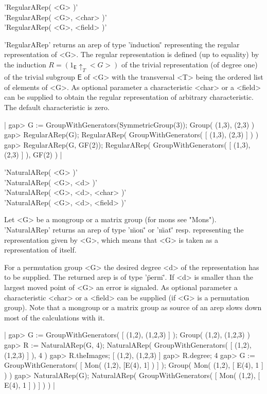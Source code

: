 
'RegularARep( <G> )'\\
'RegularARep( <G>, <char> )'\\
'RegularARep( <G>, <field> )'

'RegularARep' returns an arep of type '\"induction\"' representing
the regular representation of <G>. The regular representation is 
defined (up to equality) by the induction 
$R = (1_{\mathsf{E}}\uparrow_T <G>)$ of the trivial representation
(of degree one) of the trivial subgroup $\mathsf{E}$ of <G> with 
the transversal <T> being the ordered list of elements of <G>.
As optional parameter a characteristic <char> or a <field> 
can be supplied to obtain the regular representation of arbitrary 
characteristic. The default characteristic is zero.

|    gap> G := GroupWithGenerators(SymmetricGroup(3));
    Group( (1,3), (2,3) )
    gap> RegularARep(G);
    RegularARep( GroupWithGenerators( [ (1,3), (2,3) ] ) )
    gap> RegularARep(G, GF(2));
    RegularARep( GroupWithGenerators( [ (1,3), (2,3) ] ), GF(2) ) |


'NaturalARep( <G> )'\\
'NaturalARep( <G>, <d> )'\\
'NaturalARep( <G>, <d>, <char> )'\\
'NaturalARep( <G>, <d>, <field> )'

Let <G> be a mongroup or a matrix group (for mons see "Mons"). 
'NaturalARep' returns an arep of type '\"mon\"' or '\"mat\"' resp. 
representing the representation given by <G>, 
which means that <G> is taken as a representation of itself.

For a permutation group <G> the desired degree <d> of the 
representation has to be supplied. The returned arep is of 
type '\"perm\"'. If <d> is smaller than the 
largest moved point of <G> an error is signaled. 
As optional parameter a characteristic <char> or a <field> 
can be supplied (if <G> is a permutation group).
Note that a mongroup or a matrix group as source of an arep
slows down most of the calculations with it.

|    gap> G := GroupWithGenerators( [ (1,2), (1,2,3) ] );
    Group( (1,2), (1,2,3) )
    gap> R := NaturalARep(G, 4);
    NaturalARep( GroupWithGenerators( [ (1,2), (1,2,3) ] ), 4 )
    gap> R.theImages;
    [ (1,2), (1,2,3) ]
    gap> R.degree;
    4
    gap> G := GroupWithGenerators( [ Mon( (1,2), [E(4), 1] ) ] );
    Group( Mon(
      (1,2),
      [ E(4), 1 ]
    ) )
    gap> NaturalARep(G);
    NaturalARep( 
      GroupWithGenerators( [ Mon(
          (1,2),
          [ E(4), 1 ]
        ) ] ) ) |


